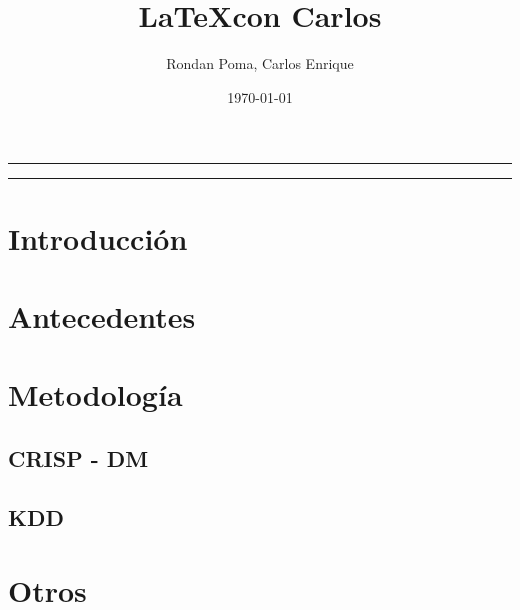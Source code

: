 \documentclass[10pt,a4paper]{article}
\author{Rondan Poma, Carlos Enrique}
\title{\LaTeX con Carlos}
\date{\today}
\begin{document}
	\maketitle
	\begin{center}
		\rule{15cm}{1pt}
		\begin{abstract}
			\lipsum[1] 
		\end{abstract}
		\rule{15cm}{1pt}
	\end{center}
	\tableofcontents
	\vspace{1cm}
	\begin{multicols}{2}
		
		\section{Introducción}
		\lipsum[2-6]
		\section{Antecedentes}
		\lipsum[2-8]
		\section{Metodología}
		\subsection{CRISP - DM}
		\lipsum[2-6]
		\subsection{KDD}
		\lipsum[2-6]
		\section{Otros}
		\lipsum[2-6]
		
	\end{multicols}
	
\end{document}
